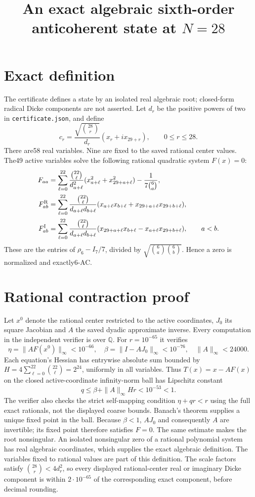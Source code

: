 \documentclass[11pt]{article}
\begin{document}
\title{An exact algebraic sixth-order anticoherent state at $N=28$}
\author{}\date{}\maketitle
\section*{Exact definition}
The certificate defines a state by an isolated real algebraic root;
closed-form radical Dicke components are not asserted. Let $d_r$ be the
positive powers of two in \texttt{certificate.json}, and define
\[
c_r=\frac{\sqrt{\binom{28}r}}{d_r}(x_r+i x_{29+r}),\qquad0\le r\le28.
\]
There are58 real variables. Nine are fixed to the saved rational center
values. The49 active variables solve the following rational quadratic
system $F(x)=0$:
\begin{align*}
F_{aa}&=\sum_{\ell=0}^{22}\frac{\binom{22}\ell}{d_{a+\ell}^2}
(x_{a+\ell}^2+x_{29+a+\ell}^2)-\frac1{7\binom6a},\\
F_{ab}^{\rm R}&=\sum_{\ell=0}^{22}\frac{\binom{22}\ell}{d_{a+\ell}d_{b+\ell}}
(x_{a+\ell}x_{b+\ell}+x_{29+a+\ell}x_{29+b+\ell}),\\
F_{ab}^{\rm I}&=\sum_{\ell=0}^{22}\frac{\binom{22}\ell}{d_{a+\ell}d_{b+\ell}}
(x_{29+a+\ell}x_{b+\ell}-x_{a+\ell}x_{29+b+\ell}),\qquad a<b.
\end{align*}
These are the entries of $\rho_6-I_7/7$, divided by
$\sqrt{\binom6a\binom6b}$. Hence a zero is normalized and exactly6-AC.

\section*{Rational contraction proof}
Let $x^0$ denote the rational center restricted to the active coordinates,
$J_0$ its square Jacobian and $A$ the saved dyadic approximate inverse.
Every computation in the independent verifier is over $\mathbb Q$.
For $r=10^{-65}$ it verifies
\[
\eta=\|AF(x^0)\|_\infty<10^{-66},\quad
\beta=\|I-AJ_0\|_\infty<10^{-76},\quad
\|A\|_\infty<24000.
\]
Each equation's Hessian has entrywise absolute sum bounded by
$H=4\sum_{\ell=0}^{22}\binom{22}\ell=2^{24}$, uniformly in all variables.
Thus $T(x)=x-AF(x)$ on the closed active-coordinate infinity-norm ball
has Lipschitz constant
\[
q\le\beta+\|A\|_\infty Hr<10^{-53}<1.
\]
The verifier also checks the strict self-mapping condition
$\eta+qr<r$ using the full exact rationals, not the displayed coarse bounds.
Banach's theorem supplies a unique fixed point in the ball. Because
$\beta<1$, $AJ_0$ and consequently $A$ are invertible; its fixed point
therefore satisfies $F=0$. The same estimate makes the root nonsingular.
An isolated nonsingular zero of a rational polynomial system has real
algebraic coordinates, which supplies the exact algebraic definition.
The variables fixed to rational values are part of this definition.
The scale factors satisfy $\binom{28}r<4d_r^2$, so every displayed
rational-center real or imaginary Dicke component is within $2\cdot10^{-65}$
of the corresponding exact component, before decimal rounding.
\end{document}
